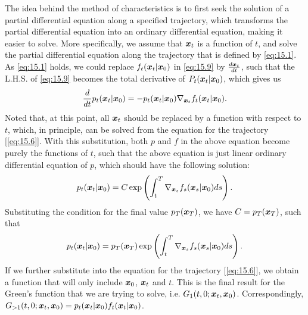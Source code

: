 The idea behind the method of characteristics is to first seek the solution of a partial differential equation along a specified trajectory, which transforms the partial differential equation into an ordinary differential equation, making it easier to solve. More specifically, we assume that $\bm{x}_{t}$ is a function of $t$, and solve the partial differential equation along the trajectory that is defined by \cref{eq:15.1}. As \cref{eq:15.1} holds, we could replace $f_t(\bm{x}_{t}|\bm{x}_0)$ in \cref{eq:15.9} by $\frac{d\bm{x}_{t}}{dt}$, such that the L.H.S. of \cref{eq:15.9} becomes the total derivative of $P_t(\bm{x}_{t}|\bm{x}_0)$, which gives us
\begin{equation}
    \label{eq:15.10}
    \frac{d}{dt}p_t(\bm{x}_{t}|\bm{x}_0)=-p_t(\bm{x}_{t}|\bm{x}_0)\nabla_{\bm{x}_{t}}f_t(\bm{x}_{t}|\bm{x}_0).
\end{equation}
Noted that, at this point, all $\bm{x}_{t}$ should be replaced by a function with respect to $t$, which, in principle, can be solved from the equation for the trajectory [\cref{eq:15.6}]. With this substitution, both $p$ and $f$ in the above equation become purely the functions of $t$, such that the above equation is just  linear ordinary differential equation of $p$, which should have the following solution:
\begin{equation}
    \label{eq:15.11}
    p_t(\bm{x}_{t}|\bm{x}_0) =C\exp \left( \int_t^T\nabla_{\bm{x}_s} f_s(\bm{x}_s|\bm{x}_0)ds \right).
\end{equation}
Substituting the condition for the final value $p_T (\bm{x}_T)$, we have $C=p_T (\bm{x}_T)$, such that 
\begin{equation}
    \label{eq:15.12}
    p_t(\bm{x}_{t}|\bm{x}_0) =p_T (\bm{x}_T)\exp \left( \int_t^T\nabla_{\bm{x}_s} f_s(\bm{x}_s|\bm{x}_0)ds \right).
\end{equation}
If we further substitute into the equation for the trajectory [\cref{eq:15.6}], we obtain a function that will only include $\bm{x}_0$, $\bm{x}_{t}$ and $t$. This is the final result for the Green's function that we are trying to solve, i.e. $G_{1}(t,0;\bm{x}_{t},\bm{x}_0)$. Correspondingly, $G_{>1}(t,0;\bm{x}_{t},\bm{x}_0)=p_t(\bm{x}_{t}|\bm{x}_0)f_t(\bm{x}_{t}|\bm{x}_0)$.

